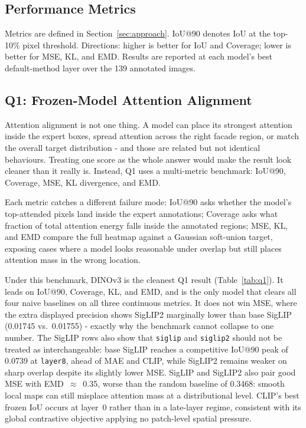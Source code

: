 \documentclass{article}
\begin{document}
\subsection{Performance Metrics}

Metrics are defined in Section~\ref{sec:approach}. IoU@90 denotes IoU at the
top-10\% pixel threshold. Directions: higher is better for IoU and Coverage;
lower is better for MSE, KL, and EMD. Results are reported at each model's
best default-method layer over the 139 annotated images.

\subsection{Q1: Frozen-Model Attention Alignment}

Attention alignment is not one thing. A model can place its strongest attention
inside the expert boxes, spread attention across the right facade region, or
match the overall target distribution - and those are related but not identical
behaviours. Treating one score as the whole answer would make the result look
cleaner than it really is. Instead, Q1 uses a multi-metric benchmark: IoU@90,
Coverage, MSE, KL divergence, and EMD.

Each metric catches a different failure mode: IoU@90 asks whether the model's
top-attended pixels land inside the expert annotations; Coverage asks what
fraction of total attention energy falls inside the annotated regions; MSE, KL,
and EMD compare the full heatmap against a Gaussian soft-union target, exposing
cases where a model looks reasonable under overlap but still places attention
mass in the wrong location.

Under this benchmark, DINOv3 is the cleanest Q1 result (Table~\ref{tab:q1}).
It leads on IoU@90, Coverage, KL, and EMD, and is the only model that clears
all four naive baselines on all three continuous metrics. It does not win MSE,
where the extra displayed precision shows SigLIP2 marginally lower than base
SigLIP (0.01745 vs.\ 0.01755) - exactly why the benchmark cannot collapse
to one number. The SigLIP rows also show that \texttt{siglip} and
\texttt{siglip2} should not be treated as interchangeable: base SigLIP
reaches a competitive IoU@90 peak of 0.0739 at \texttt{layer8}, ahead of MAE
and CLIP, while SigLIP2 remains weaker on sharp overlap despite its slightly
lower MSE. SigLIP and SigLIP2 also pair good MSE with EMD~$\approx$~0.35,
worse than the random baseline of 0.3468: smooth local maps can still
misplace attention mass at a distributional level. CLIP's best frozen IoU
occurs at layer~0 rather than in a late-layer regime, consistent with its
global contrastive objective applying no patch-level spatial pressure.
\end{document}
